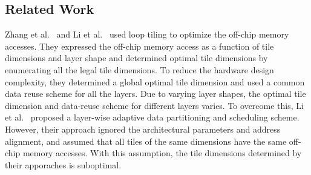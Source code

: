 \documentclass[a4paper,10pt]{article}
\begin{document}
\subsection{Related Work}
Zhang et al.~\cite{zhang2015optimizing} and Li et al.~\cite{Li2018SmartShuttleOO} used loop tiling to optimize the off-chip memory accesses. They expressed the off-chip memory access as a function of tile dimensions and layer shape and determined optimal tile dimensions by enumerating all the legal tile dimensions. To reduce the hardware design complexity, they determined a global optimal tile dimension and used a common data reuse scheme for all the layers. Due to varying layer shapes, the optimal tile dimension and data-reuse scheme for different layers varies. To overcome  this, Li et al.~\cite{Li2018SmartShuttleOO} proposed a layer-wise adaptive data partitioning and scheduling scheme. However, their approach ignored the architectural parameters and address alignment, and assumed that all tiles of the same dimensions have the same off-chip memory accesses.  With this assumption, the tile dimensions determined by their apporaches is suboptimal.
\end{document}
